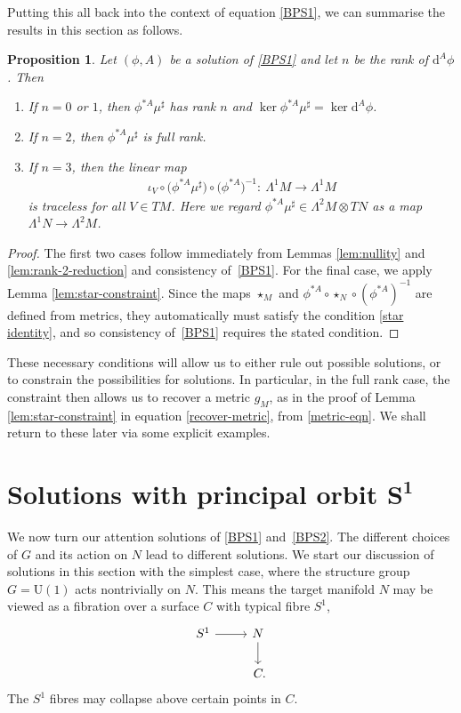 \documentclass[10pt,a4paper]{amsart}
\newcommand{\U}{{\mathrm{U}}}
\newcommand{\1}{{\mathbb{1}}}
\def \d{\mathrm{d}}
\numberwithin{equation}{section}
\newtheorem{Proposition}[Theorem]{Proposition}
 { \theoremstyle{definition}
\newtheorem{Definition}[Theorem]{Definition}
\newtheorem{Note}[Theorem]{Note}
\newtheorem{Example}[Theorem]{Example}
\newtheorem{Remark}[Theorem]{Remark} }
\begin{document}
Putting this all back into the context of equation \eqref{BPS1}, we can summarise the results in this section as follows.
\begin{Proposition}\label{prop:nec-for-BPS1}
 Let $(\phi,A)$ be a solution of \eqref{BPS1} and let $n$ be the rank of $\d^A\phi$. Then
 \begin{enumerate}\itemsep=0pt
 \item[$1.$] If $n=0$ or $1$, then $\phi^{\ast A}\mu^\sharp$ has rank $n$ and $\ker\phi^{\ast A}\mu^\sharp=\ker\d^A\phi$.
 \item[$2.$] If $n=2$, then $\phi^{\ast A}\mu^\sharp$ is full rank.
 \item[$3.$] If $n=3$, then the linear map
\begin{align*}
 \iota_V\circ\big(\phi^{\ast A}\mu^\sharp\big)\circ\big(\phi^{\ast A}\big)^{-1}\colon \ \Lambda^1M\to\Lambda^1M
\end{align*}
is traceless for all $V\in TM$. Here we regard $\phi^{\ast A}\mu^\sharp\in\Lambda^2M\otimes TN$ as a map $\Lambda^1N\to\Lambda^2M$.
 \end{enumerate}
\end{Proposition}
\begin{proof}
 The first two cases follow immediately from Lemmas \ref{lem:nullity} and \ref{lem:rank-2-reduction} and consistency of~\eqref{BPS1}. For the final case, we apply Lemma \ref{lem:star-constraint}. Since the maps $\star_{M}$ and $\phi^{\ast A}\circ\star_{N}\circ(\phi^{\ast A})^{-1}$ are defined from metrics, they automatically must satisfy the condition \eqref{star identity}, and so consistency of~\eqref{BPS1} requires the stated condition.
\end{proof}

These necessary conditions will allow us to either rule out possible solutions, or to constrain the possibilities for solutions. In particular, in the full rank case, the constraint then allows us to recover a metric $g_M$, as in the proof of Lemma \ref{lem:star-constraint} in equation \eqref{recover-metric}, from \eqref{metric-eqn}. We shall return to these later via some explicit examples.

\section[Solutions with principal orbit S\^{}1]{Solutions with principal orbit $\boldsymbol{S^1}$}\label{sec:princ-orbit-S1}

We now turn our attention solutions of \eqref{BPS1} and~\eqref{BPS2}. The different choices of $G$ and its action on $N$ lead to different solutions. We start our discussion of solutions in this section with the simplest case, where the structure group $G=\U(1)$ acts nontrivially on $N$. This means the target manifold $N$ may be viewed as a fibration over a surface $C$ with typical fibre $S^1$,
\begin{equation*}%
\begin{tikzcd}
S^1\arrow{r}{}&N\arrow{d}{}\\
&\hphantom{.}C.
\end{tikzcd}
\end{equation*}
The $S^1$ fibres may collapse above certain points in $C$.
\end{document}
